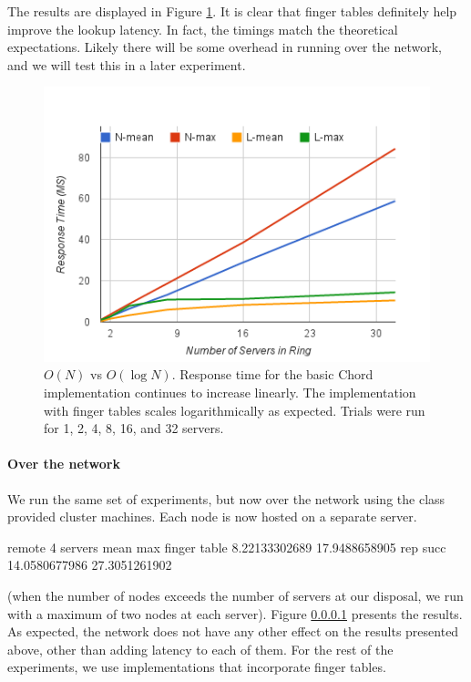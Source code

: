 \documentclass{sig-alternate-10pt}
\begin{document}
The results are displayed in Figure \ref{fig:finger-tables}. It is clear that finger tables definitely help improve the lookup latency. In fact, the timings match the theoretical expectations.  Likely there will be some overhead in running over the network, and we will test this in a later experiment.

\begin{figure}[h]
\centering
\includegraphics[width=1\columnwidth]{./response2.png}
\caption{$O(N)$ vs $O(\log N)$.  Response time for the basic Chord implementation continues to increase linearly.  The implementation with finger tables scales logarithmically as expected. Trials were run for 1, 2, 4, 8, 16, and 32 servers.}
\label{fig:finger-tables}
\end{figure}


\paragraph{Over the network}
We run the same set of experiments, but now over the network using the class provided cluster machines. Each node is now hosted on a separate server.  

remote 4 servers	mean	max
finger table	8.22133302689	17.9488658905
rep succ	14.0580677986	27.3051261902

(when the number of nodes exceeds the number of servers at our disposal, we run with a maximum of two nodes at each server). Figure \ref{} presents the results. As expected, the network does not have any other effect on the results presented above, other than adding latency to each of them.
For the rest of the experiments, we use implementations that incorporate finger tables.
\end{document}
